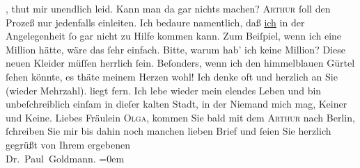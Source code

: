 \begin{ledgroupsized}[t]{13cm}
{{{               }}}\label{K_L03086-7h}, thut mir unendlich leid. Kann man da gar nichts machen? \textsc{Arthur} ſoll den Prozeß nur jedenfalls einleiten. Ich bedaure namentlich, daß
                  \uline{ich} in der Angelegenheit ſo gar nicht zu Hilfe
               kommen kann. Zum Beiſpiel, wenn ich eine Million hätte, wäre das ſehr einfach. Bitte,
               warum hab’ ich keine Million?\pend
           \pstart
           Diese neuen Kleider müſſen herrlich ſein. Beſonders, wenn ich den himmelblauen
               Gürtel ſehen könnte, es thäte meinem Herzen wohl!\pend
           \pstart
           Ich denke oft und herzlich an Sie (wieder Mehrzahl). \label{K_L03086-8v}\label{K_L03086-8h} liegt fern. Ich lebe wieder mein elendes Leben und bin unbeſchreiblich einſam
               in dieſer kalten Stadt, in der
               Niemand mich mag, Keiner und Keine.\pend
           \pstart
           {\pb}Liebes Fräulein \textsc{Olga},
               kommen Sie bald mit dem \textsc{Arthur} nach Berlin, ſchreiben Sie mir bis dahin noch manchen lieben Brief
               und ſeien Sie herzlich gegrüßt von\pend
           \pstart
            Ihrem ergebenen{\\[\baselineskip]}\spacefill\mbox{Dr. Paul Goldmann.}\pend
           \leftskip=0em{}
         
         \endnumbering{}\end{ledgroupsized}  \newcommand{\dateiname}{L03086}\newcommand{\titel}{Paul Goldmann an Arthur Schnitzler, Olga und Elisabeth Gussmann, 27. 9. [1901]}\newcommand{\editorInnen}{Martin Anton Müller und Laura Untner}
      